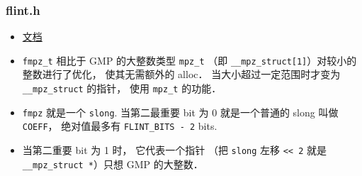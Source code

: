 
\begin{issues}
\issueDraft
\end{issues}


\subsubsection{flint.h}
\begin{itemize}
\item \href{http://flintlib.org/sphinx/fmpz.html}{文档}
\item \verb|fmpz_t| 相比于 GMP 的大整数类型 \verb|mpz_t| （即 \verb|__mpz_struct[1]|）对较小的整数进行了优化， 使其无需额外的 alloc． 当大小超过一定范围时才变为 \verb|__mpz_struct| 的指针， 使用 \verb|mpz_t| 的功能．
\item \verb|fmpz| 就是一个 \verb|slong|. 当第二最重要 bit 为 0 就是一个普通的 slong 叫做 \verb|COEFF|， 绝对值最多有 \verb|FLINT_BITS - 2| bits.
\item 当第二重要 bit 为 1 时， 它代表一个指针 （把 \verb|slong| 左移 \verb|<< 2| 就是 \verb|__mpz_struct *|）只想 GMP 的大整数．
\end{itemize}
